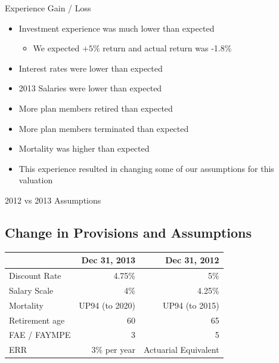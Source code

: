 \documentclass{beamer}
\begin{document}
\begin{frame}{Experience Gain / Loss}

\begin{itemize}
\item Investment experience was much lower than expected
\begin{itemize}
\item We expected $+5\%$ return and actual return was -1.8\%
\end{itemize}
\item Interest rates were lower than expected
\item 2013 Salaries were lower than expected
\item More plan members retired than expected
\item More plan members terminated than expected
\item Mortality was higher than expected
\item This experience resulted in changing some of our assumptions for this valuation
\end{itemize}

\end{frame}

\begin{frame}{2012 vs 2013 Assumptions}

\subsection{Change in Provisions and Assumptions}

\begin{table}[ht]
\begin{tabular}{l r r}
\hline
& Dec 31, 2013 & Dec 31, 2012 \\ \hline
Discount Rate & 4.75\% & 5\% \\
Salary Scale & 4\% & 4.25\% \\
Mortality & UP94 (to 2020) & UP94 (to 2015) \\
Retirement age & 60 & 65 \\ 
FAE / FAYMPE & 3 & 5 \\
ERR & 3\% per year & Actuarial Equivalent \\ \hline
\end{tabular}
\end{table}

\end{frame}
\end{document}
